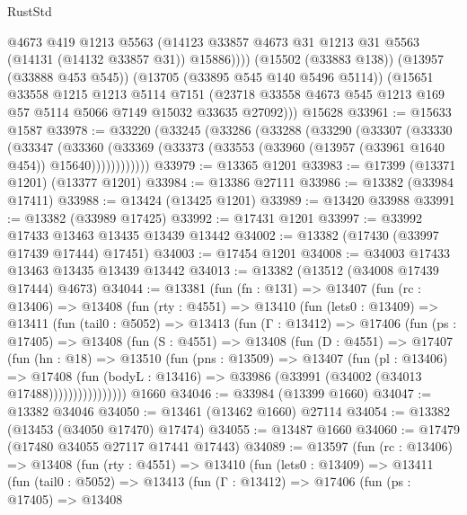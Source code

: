\begin{lexlean}{RustStd}
\begin{coremodule}
            @4673
            @419
            @1213
            @5563
            (@14123 @33857 @4673 @31 @1213 @31 @5563 (@14131 (@14132 @33857 @31)) @15886))))
      (@15502 (@33883 @138))
      (@13957 (@33888 @453 @545))
      (@13705 (@33895 @545 @140 @5496 @5114))
      (@15651
        @33558
        @1215
        @1213
        @5114
        @7151
        (@23718 @33558 @4673 @545 @1213 @169 @57 @5114 @5066 @7149 @15032 @33635 @27092)))
    @15628
@33961 := @15633 @1587
@33978 := @33220
    (@33245
      (@33286
        (@33288
          (@33290
            (@33307
              (@33330
                (@33347
                  (@33360
                    (@33369 (@33373 (@33553 (@33960 (@13957 (@33961 @1640 @454)) @15640))))))))))))
@33979 := @13365 @1201
@33983 := @17399 (@13371 @1201) (@13377 @1201)
@33984 := @13386 @27111
@33986 := @13382 (@33984 @17411)
@33988 := @13424 (@13425 @1201)
@33989 := @13420 @33988
@33991 := @13382 (@33989 @17425)
@33992 := @17431 @1201
@33997 := @33992 @17433 @13463 @13435 @13439 @13442
@34002 := @13382 (@17430 (@33997 @17439 @17444) @17451)
@34003 := @17454 @1201
@34008 := @34003 @17433 @13463 @13435 @13439 @13442
@34013 := @13382 (@13512 (@34008 @17439 @17444) @4673)
@34044 := @13381
    (fun (fn : @131) =>
    @13407
      (fun (rc : @13406) =>
      @13408
        (fun (rty : @4551) =>
        @13410
          (fun (lets0 : @13409) =>
          @13411
            (fun (tail0 : @5052) =>
            @13413
              (fun (Γ : @13412) =>
              @17406
                (fun (ps : @17405) =>
                @13408
                  (fun (S : @4551) =>
                  @13408
                    (fun (D : @4551) =>
                    @17407
                      (fun (hn : @18) =>
                      @13510
                        (fun (pns : @13509) =>
                        @13407
                          (fun (pl : @13406) =>
                          @17408
                            (fun (bodyL : @13416) =>
                            @33986 (@33991 (@34002 (@34013 @17488))))))))))))))))
    @1660
@34046 := @33984 (@13399 @1660)
@34047 := @13382 @34046
@34050 := @13461 (@13462 @1660) @27114
@34054 := @13382 (@13453 (@34050 @17470) @17474)
@34055 := @13487 @1660
@34060 := @17479 (@17480 @34055 @27117 @17441 @17443)
@34089 := @13597
    (fun (rc : @13406) =>
    @13408
      (fun (rty : @4551) =>
      @13410
        (fun (lets0 : @13409) =>
        @13411
          (fun (tail0 : @5052) =>
          @13413
            (fun (Γ : @13412) =>
            @17406
              (fun (ps : @17405) =>
              @13408

\end{coremodule}
\end{lexlean}
